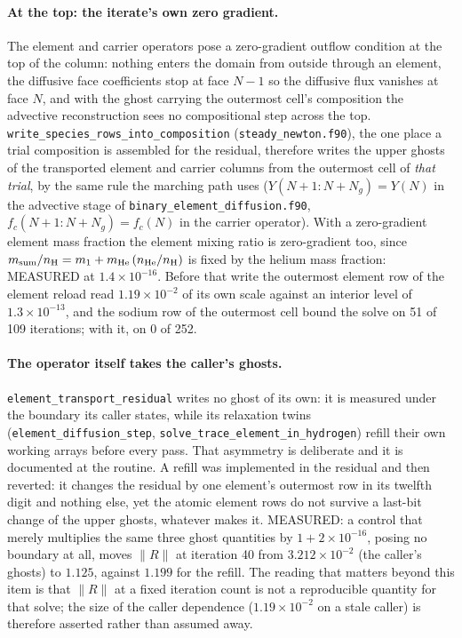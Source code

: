 \documentclass[english,a4paper]{my_memo}
\begin{document}
\paragraph{At the top: the iterate's own zero gradient.}
The element and carrier operators pose a zero-gradient outflow condition at
the top of the column: nothing enters the domain from outside through an
element, the diffusive face coefficients stop at face $N-1$ so the diffusive
flux vanishes at face $N$, and with the ghost carrying the outermost cell's
composition the advective reconstruction sees no compositional step across
the top. \texttt{write\_species\_rows\_into\_composition}
(\texttt{steady\_newton.f90}), the one place a trial composition is
assembled for the residual, therefore writes the upper ghosts of the
transported element and carrier columns from the outermost cell of
\emph{that trial}, by the same rule the marching path uses
($Y(N{+}1{:}N{+}N_g) = Y(N)$ in the advective stage of
\texttt{binary\_element\_diffusion.f90}, $f_c(N{+}1{:}N{+}N_g) = f_c(N)$ in
the carrier operator). With a zero-gradient element mass fraction the
element mixing ratio is zero-gradient too, since
$m_{\rm sum}/n_{\rm H} = m_1 + m_{\rm He}\,(n_{\rm He}/n_{\rm H})$ is fixed
by the helium mass fraction: MEASURED at $1.4\times10^{-16}$. Before that
write the outermost element row of the element reload read
$1.19\times10^{-2}$ of its own scale against an interior level of
$1.3\times10^{-13}$, and the sodium row of the outermost cell bound the
solve on 51 of 109 iterations; with it, on 0 of 252.

\paragraph{The operator itself takes the caller's ghosts.}
\texttt{element\_transport\_residual} writes no ghost of its own: it is
measured under the boundary its caller states, while its relaxation twins
(\texttt{element\_diffusion\_step},
\texttt{solve\_trace\_element\_in\_hydrogen}) refill their own working
arrays before every pass. That asymmetry is deliberate and it is
documented at the routine. A refill was implemented in the residual and
then reverted: it changes the residual by one element's outermost row in
its twelfth digit and nothing else, yet the atomic element rows do not
survive a last-bit change of the upper ghosts, whatever makes it. MEASURED:
a control that merely multiplies the same three ghost quantities by
$1 + 2\times10^{-16}$, posing no boundary at all, moves $\|R\|$ at iteration
40 from $3.212\times10^{-2}$ (the caller's ghosts) to $1.125$, against
$1.199$ for the refill. The reading that matters beyond this item is that
$\|R\|$ at a fixed iteration count is not a reproducible quantity for that
solve; the size of the caller dependence ($1.19\times10^{-2}$ on a stale
caller) is therefore asserted rather than assumed away.
\end{document}
